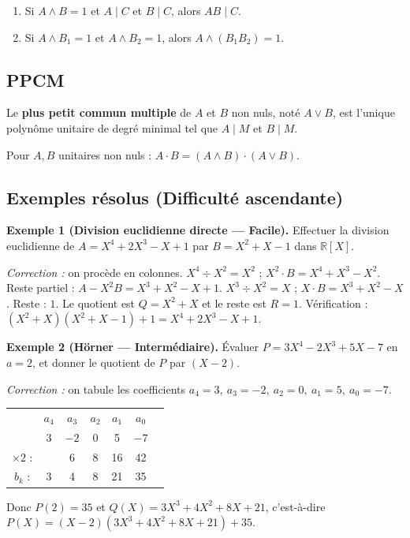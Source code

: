 \begin{corollaire}
\begin{enumerate}
    \item Si $A \wedge B = 1$ et $A \mid C$ et $B \mid C$, alors $A B \mid C$.
    \item Si $A \wedge B_1 = 1$ et $A \wedge B_2 = 1$, alors $A \wedge (B_1 B_2) = 1$.
\end{enumerate}
\end{corollaire}

\subsection{PPCM}

\begin{definition}[PPCM]
Le \textbf{plus petit commun multiple} de $A$ et $B$ non nuls, noté $A \vee B$, est l'unique polynôme unitaire de degré minimal tel que $A \mid M$ et $B \mid M$.
\end{definition}

\begin{proposition}
Pour $A, B$ unitaires non nuls : $A \cdot B = (A \wedge B) \cdot (A \vee B)$.
\end{proposition}

\subsection{Exemples résolus (Difficulté ascendante)}

\textbf{Exemple 1 (Division euclidienne directe --- Facile).}
Effectuer la division euclidienne de $A = X^4 + 2X^3 - X + 1$ par $B = X^2 + X - 1$ dans $\mathbb{R}[X]$.

\textit{Correction :} on procède en colonnes.
$X^4 \div X^2 = X^2$ ; $X^2 \cdot B = X^4 + X^3 - X^2$. Reste partiel : $A - X^2 B = X^3 + X^2 - X + 1$.
$X^3 \div X^2 = X$ ; $X \cdot B = X^3 + X^2 - X$. Reste : $1$.
Le quotient est $Q = X^2 + X$ et le reste est $R = 1$. Vérification : $(X^2 + X)(X^2 + X - 1) + 1 = X^4 + 2X^3 - X + 1$. \checkmark

\medskip

\textbf{Exemple 2 (Hörner --- Intermédiaire).}
Évaluer $P = 3X^4 - 2X^3 + 5X - 7$ en $a = 2$, et donner le quotient de $P$ par $(X - 2)$.

\textit{Correction :} on tabule les coefficients $a_4 = 3,\ a_3 = -2,\ a_2 = 0,\ a_1 = 5,\ a_0 = -7$.
\begin{center}
\begin{tabular}{c|cccccc}
 & $a_4$ & $a_3$ & $a_2$ & $a_1$ & $a_0$ \\
 & 3 & $-2$ & 0 & 5 & $-7$ \\
\hline
$\times 2$ : & & 6 & 8 & 16 & 42 \\
\hline
$b_k$ : & 3 & 4 & 8 & 21 & 35
\end{tabular}
\end{center}
Donc $P(2) = 35$ et $Q(X) = 3X^3 + 4X^2 + 8X + 21$, c'est-à-dire $P(X) = (X - 2)(3X^3 + 4X^2 + 8X + 21) + 35$.

